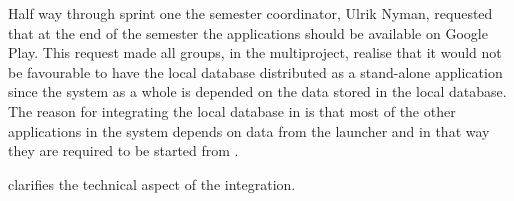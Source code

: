 Half way through sprint one the semester coordinator, Ulrik Nyman, requested that at the end of the semester the applications should be available on Google Play.
This request made all groups, in the multiproject, realise that it would not be favourable to have the local database distributed as a stand-alone application since the \giraf system as a whole is depended on the data stored in the local database.
The reason for integrating the local database in \launcher is that most of the other applications in the \giraf system depends on data from the launcher and in that way they are required to be started from \launcher.

 clarifies the technical aspect of the integration.